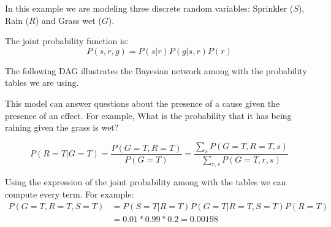 \begin{exampleth}
In this example we are modeling three discrete random variables: Sprinkler (\(S\)),
Rain (\(R\)) and Grass wet (\(G\)).

The joint probability function is:
\[
P(s,r,g) = P(s|r)P(g|s,r)P(r)
\]

The following DAG illustrates the Bayesian network among with the probability
tables we are using.

\begin{figure}[ht]
\end{figure}

This model can answer questions about the presence of a cause given the presence
of an effect. For example, What is the probability that it has being raining
given the grass is wet?

\[
P(R = T | G = T) = \frac{P(G = T, R = T)}{P(G=T)} = \frac{\sum_{s}P(G=T, R=T,
s)}{\sum_{r,s} P(G=T, r, s)}
\]

Using the expression of the joint probability among with the tables we can
compute every term. For example:
\[
\begin{aligned}
P(G=T, R=T, S=T) &= P(S=T|R=T)P(G=T|R=T,S=T)P(R=T) \\
&= 0.01 * 0.99 * 0.2 = 0.00198
\end{aligned}
\]
\end{exampleth}

